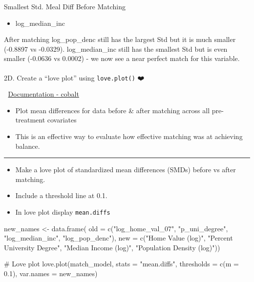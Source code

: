 \documentclass[
  letterpaper,
  DIV=11,
  numbers=noendperiod]{scrartcl}
\makeatletter
\let\oldparagraph\paragraph
\renewcommand{\paragraph}{
    \@ifstar
      \xxxParagraphStar
      \xxxParagraphNoStar
  }
\newcommand{\xxxParagraphStar}[1]{\oldparagraph*{#1}\mbox{}}
\newcommand{\xxxParagraphNoStar}[1]{\oldparagraph{#1}\mbox{}}
\newenvironment{Shaded}{\begin{snugshade}}{\end{snugshade}}
\newcommand{\AttributeTok}[1]{\textcolor[rgb]{0.40,0.45,0.13}{#1}}
\newcommand{\CommentTok}[1]{\textcolor[rgb]{0.37,0.37,0.37}{#1}}
\newcommand{\FloatTok}[1]{\textcolor[rgb]{0.68,0.00,0.00}{#1}}
\newcommand{\FunctionTok}[1]{\textcolor[rgb]{0.28,0.35,0.67}{#1}}
\newcommand{\NormalTok}[1]{\textcolor[rgb]{0.00,0.23,0.31}{#1}}
\newcommand{\OtherTok}[1]{\textcolor[rgb]{0.00,0.23,0.31}{#1}}
\newcommand{\StringTok}[1]{\textcolor[rgb]{0.13,0.47,0.30}{#1}}
\providecommand{\tightlist}{%
  \setlength{\itemsep}{0pt}\setlength{\parskip}{0pt}}
\makeatother
\begin{document}
Smallest Std. Meal Diff Before Matching

\begin{itemize}
\tightlist
\item
  log\_median\_inc
\end{itemize}

After matching log\_pop\_denc still has the largest Std but it is much
smaller (-0.8897 vs -0.0329). log\_median\_inc still has the smallest
Std but is even smaller (-0.0636 vs 0.0002) - we now see a near perfect
match for this variable.

\paragraph{\texorpdfstring{2D. Create a ``love plot'' using
\texttt{love.plot()}
❤️}{2D. Create a ``love plot'' using love.plot() ❤️}}\label{d.-create-a-love-plot-using-love.plot}

📜 \href{https://ngreifer.github.io/cobalt/}{Documentation - cobalt}

\begin{itemize}
\tightlist
\item
  Plot mean differences for data before \& after matching across all
  pre-treatment covariates
\item
  This is an effective way to evaluate how effective matching was at
  achieving balance.
\end{itemize}

\begin{center}\rule{0.5\linewidth}{0.5pt}\end{center}

\begin{itemize}
\tightlist
\item
  Make a love plot of standardized mean differences (SMDs) before vs
  after matching.
\item
  Include a threshold line at 0.1.
\item
  In love plot display \texttt{mean.diffs}
\end{itemize}

\begin{Shaded}
\begin{Highlighting}[]
\NormalTok{new\_names }\OtherTok{\textless{}{-}} \FunctionTok{data.frame}\NormalTok{(}
    \AttributeTok{old =} \FunctionTok{c}\NormalTok{(}\StringTok{"log\_home\_val\_07"}\NormalTok{, }\StringTok{"p\_uni\_degree"}\NormalTok{, }\StringTok{"log\_median\_inc"}\NormalTok{, }\StringTok{"log\_pop\_denc"}\NormalTok{),}
    \AttributeTok{new =} \FunctionTok{c}\NormalTok{(}\StringTok{"Home Value (log)"}\NormalTok{, }\StringTok{"Percent University Degree"}\NormalTok{,}
            \StringTok{"Median Income (log)"}\NormalTok{, }\StringTok{"Population Density (log)"}\NormalTok{))}

\CommentTok{\# Love plot}
\FunctionTok{love.plot}\NormalTok{(match\_model, }\AttributeTok{stats =} \StringTok{"mean.diffs"}\NormalTok{,}
          \AttributeTok{thresholds =} \FunctionTok{c}\NormalTok{(}\AttributeTok{m =} \FloatTok{0.1}\NormalTok{),}
          \AttributeTok{var.names =}\NormalTok{ new\_names)}
\end{Highlighting}
\end{Shaded}
\end{document}
